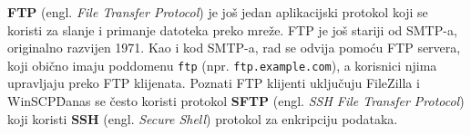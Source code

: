 \textbf{FTP} (engl. \textit{File Transfer Protocol}) je još jedan aplikacijski protokol koji se koristi za slanje i primanje datoteka preko mreže.
FTP je još stariji od SMTP-a, originalno razvijen 1971.
Kao i kod SMTP-a, rad se odvija pomoću FTP servera, koji obično imaju poddomenu \verb|ftp| (npr. \verb|ftp.example.com|), a korisnici njima upravljaju preko FTP klijenata.
Poznati FTP klijenti uključuju FileZilla i WinSCP\.
Danas se često koristi protokol \textbf{SFTP} (engl. \textit{SSH File Transfer Protocol}) koji koristi \textbf{SSH} (engl. \textit{Secure Shell}) protokol za enkripciju podataka.

